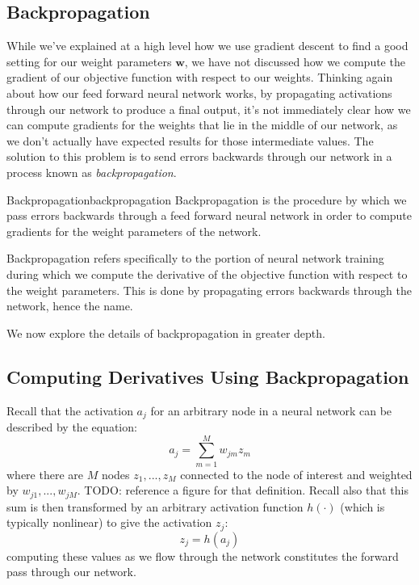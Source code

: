 \subsection{Backpropagation}
While we've explained at a high level how we use gradient descent to find a good setting for our weight parameters $\textbf{w}$, we have not discussed how we compute the gradient of our objective function with respect to our weights. Thinking again about how our feed forward neural network works, by propagating activations through our network to produce a final output, it's not immediately clear how we can compute gradients for the weights that lie in the middle of our network, as we don't actually have expected results for those intermediate values. The solution to this problem is to send errors backwards through our network in a process known as \textit{backpropagation}.

\begin{definition}{Backpropagation}{backpropagation}
Backpropagation is the procedure by which we pass errors backwards through a feed forward neural network in order to compute gradients for the weight parameters of the network.
\end{definition}

Backpropagation refers specifically to the portion of neural network training during which we compute the derivative of the objective function with respect to the weight parameters. This is done by propagating errors backwards through the network, hence the name.


We now explore the details of backpropagation in greater depth.

\subsection{Computing Derivatives Using Backpropagation}
Recall that the activation $a_{j}$ for an arbitrary node in a neural network can be described by the equation:
\begin{equation} \label{activations-reminder}
	a_{j} = \sum_{m=1}^{M} w_{jm} z_{m}
\end{equation}
where there are $M$ nodes $z_{1}, ..., z_{M}$ connected to the node of interest and weighted by $w_{j1}, ..., w_{jM}$. TODO: reference a figure for that definition. Recall also that this sum is then transformed by an arbitrary activation function $h(\cdot)$ (which is typically nonlinear) to give the activation $z_{j}$:
\begin{equation} \label{transformed-activations-reminder}
	z_{j} = h(a_{j})
\end{equation}
computing these values as we flow through the network constitutes the forward pass through our network.

